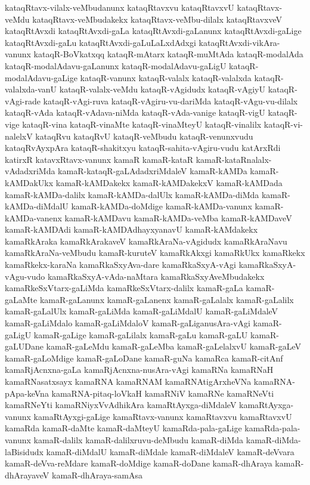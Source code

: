 {kataqRtavx-vilalx-veMbudanunx
kataqRtavxvu
kataqRtavxvU
kataqRtavx-veMdu
kataqRtavx-veMbudakekx
kataqRtavx-veMbu-dilalx
kataqRtavxveV
kataqRtAvxdi
kataqRtAvxdi-gaLa
kataqRtAvxdi-gaLanunx
kataqRtAvxdi-gaLige
kataqRtAvxdi-gaLu
kataqRtAvxdi-gaLuLaLxdAdxgi
kataqRtAvxdi-vikAra-vanunx
kataqR-BoVkatxqq
kataqR-mAtarx
kataqR-muMtAda
kataqR-modalAda
kataqR-modalAdavu-gaLanunx
kataqR-modalAdavu-gaLigU
kataqR-modalAdavu-gaLige
kataqR-vanunx
kataqR-valalx
kataqR-valalxda
kataqR-valalxda-vanU
kataqR-valalx-veMdu
kataqR-vAgidudx
kataqR-vAgiyU
kataqR-vAgi-rade
kataqR-vAgi-ruva
kataqR-vAgiru-vu-dariMda
kataqR-vAgu-vu-dilalx
kataqR-vAda
kataqR-vAdava-niMda
kataqR-vAda-vanige
kataqR-vigU
kataqR-vige
kataqR-vina
kataqR-vinaMte
kataqR-vinaMteyU
kataqR-vinalilx
kataqR-vi-nalelxV
kataqRvu
kataqRvU
kataqR-veMbudu
kataqR-venunxvudu
kataqRvAyxpAra
kataqR-shakitxyu
kataqR-sahita-vAgiru-vudu
katArxRdi
katirxR
katavxRtavx-vanunx
kamaR
kamaR-kataR
kamaR-kataRnalalx-vAdadxriMda
kamaR-kataqR-gaLAdadxriMdaleV
kamaR-kAMDa
kamaR-kAMDakUkx
kamaR-kAMDakekx
kamaR-kAMDakekxV
kamaR-kAMDada
kamaR-kAMDa-dalilx
kamaR-kAMDa-dalUlx
kamaR-kAMDa-diMda
kamaR-kAMDa-diMdalU
kamaR-kAMDa-doMdige
kamaR-kAMDa-vanunx
kamaR-kAMDa-vanenx
kamaR-kAMDavu
kamaR-kAMDa-veMba
kamaR-kAMDaveV
kamaR-kAMDAdi
kamaR-kAMDAdhayxyanavU
kamaR-kAMdakekx
kamaRkAraka
kamaRkArakaveV
kamaRkAraNa-vAgidudx
kamaRkAraNavu
kamaRkAraNa-veMbudu
kamaR-kuruteV
kamaRkAkxgi
kamaRkUkx
kamaRkekx
kamaRkekx-karaNa
kamaRkaSxyAva-dare
kamaRkaSxyA-vAgi
kamaRkaSxyA-vAgu-vudo
kamaRkaSxyA-vAda-naMtara
kamaRkaSxyAveMbudakekx
kamaRkeSxVtarx-gaLiMda
kamaRkeSxVtarx-dalilx
kamaR-gaLa
kamaR-gaLaMte
kamaR-gaLanunx
kamaR-gaLanenx
kamaR-gaLalalx
kamaR-gaLalilx
kamaR-gaLalUlx
kamaR-gaLiMda
kamaR-gaLiMdalU
kamaR-gaLiMdaleV
kamaR-gaLiMdalo
kamaR-gaLiMdaloV
kamaR-gaLiganusAra-vAgi
kamaR-gaLigU
kamaR-gaLige
kamaR-gaLilalx
kamaR-gaLu
kamaR-gaLU
kamaR-gaLUDane
kamaR-gaLeMdu
kamaR-gaLeMba
kamaR-gaLelalxvU
kamaR-gaLeV
kamaR-gaLoMdige
kamaR-gaLoDane
kamaR-guNa
kamaRca
kamaR-citAnf
kamaRjAcnxna-gaLa
kamaRjAcnxna-nusAra-vAgi
kamaRNa
kamaRNaH
kamaRNasatxsayx
kamaRNA
kamaRNAM
kamaRNAtigArxheVNa
kamaRNA-pApa-keVna
kamaRNA-pitaq-loVkaH
kamaRNiV
kamaRNe
kamaRNeVti
kamaRNeYti
kamaRNiyxVvAdhikAra
kamaRtAyxga-diMdaleV
kamaRtAyxga-vanunx
kamaRtAyxgi-gaLige
kamaRtavx-vanunx
kamaRtavxvu
kamaRtavxvU
kamaRda
kamaR-daMte
kamaR-daMteyU
kamaRda-pala-gaLige
kamaRda-pala-vanunx
kamaR-dalilx
kamaR-dalilxruvu-deMbudu
kamaR-diMda
kamaR-diMda-laBisidudx
kamaR-diMdalU
kamaR-diMdale
kamaR-diMdaleV
kamaR-deVvara
kamaR-deVva-reMdare
kamaR-doMdige
kamaR-doDane
kamaR-dhAraya
kamaR-dhArayaveV
kamaR-dhAraya-samAsa
}
